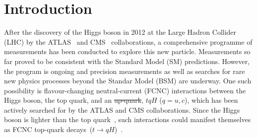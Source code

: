 \documentclass[PAPER, coverpage, atlasdraft=true, texlive=2016, UKenglish]{\ATLASLATEXPATH atlasdoc}
\providecommand{\DIFadd}[1]{{\protect\color{blue}\uwave{#1}}} %
\providecommand{\DIFdel}[1]{{\protect\color{red}\sout{#1}}}                      %
\providecommand{\DIFaddbegin}{} %
\providecommand{\DIFaddend}{} %
\providecommand{\DIFdelbegin}{} %
\providecommand{\DIFdelend}{} %
\begin{document}
\maketitle

\tableofcontents

\section{Introduction}
\label{sec:intro}
After the discovery of the Higgs boson in 2012 at the Large Hadron Collider (LHC) by the ATLAS~\cite{Aad:2012tfa} and 
CMS~\cite{Chatrchyan:2012ufa} collaborations, 
a comprehensive programme of measurements %
has been conducted to explore this new particle. Measurements so far proved to be consistent with the Standard Model (SM) predictions. 
However, the program is ongoing and precision measurements as well as searches for rare new physics processes beyond the Standar Model (BSM)
are underway. One such possibility is flavour-changing neutral-current (FCNC) interactions between the Higgs boson, 
the top quark, and an \DIFdelbegin \DIFdel{up-quark}\DIFdelend \DIFaddbegin \DIFadd{up-type quark}\DIFaddend , $tqH$ ($q=u, c$), which has been actively searched for by the ATLAS and CMS collaborations.  
Since the Higgs boson is lighter than the top quark~\cite{Aad:2015zhl},
such interactions could manifest themselves as FCNC top-quark decays~($t\to qH$)~\cite{Agashe:2013hma}.
\end{document}
